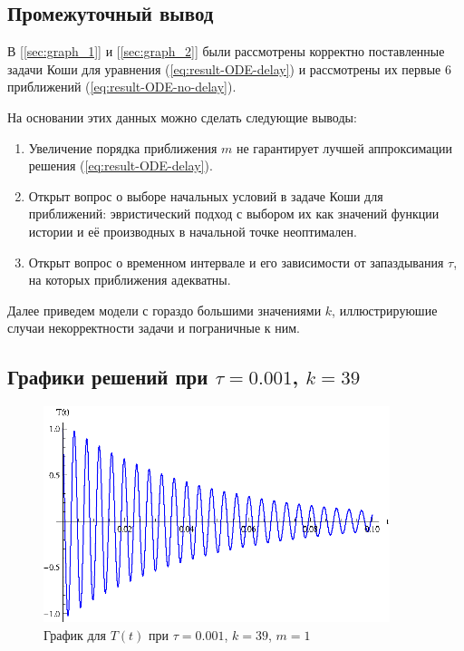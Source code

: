 \newpage

\subsection{Промежуточный вывод}

В [\ref{sec:graph_1}] и [\ref{sec:graph_2}] были рассмотрены корректно поставленные задачи Коши для уравнения (\ref{eq:result-ODE-delay}) и рассмотрены их первые $6$ приближений (\ref{eq:result-ODE-no-delay}).

На основании этих данных можно сделать следующие выводы:

\begin{enumerate}
    \item Увеличение порядка приближения $m$ не гарантирует лучшей аппроксимации решения (\ref{eq:result-ODE-delay}).
    \item Открыт вопрос о выборе начальных условий в задаче Коши для приближений: эвристический подход с выбором их как значений функции истории и её производных в начальной точке неоптимален.
    \item Открыт вопрос о временном интервале и его зависимости от запаздывания $\tau$, на которых приближения адекватны.
\end{enumerate}

Далее приведем модели с гораздо большими значениями $k$, иллюстрируюшие случаи некорректности задачи и пограничные к ним.

\newpage

\subsection{Графики решений при $\tau=0.001$, $k=39$}

\vfill

\begin{figure}[h]
\begin{center}
\includegraphics[width=0.9\textwidth]{./3_results/3_1.eps}
\end{center}
\caption{График для $T(t)$ при $\tau=0.001$, $k=39$, $m=1$}
\end{figure}

